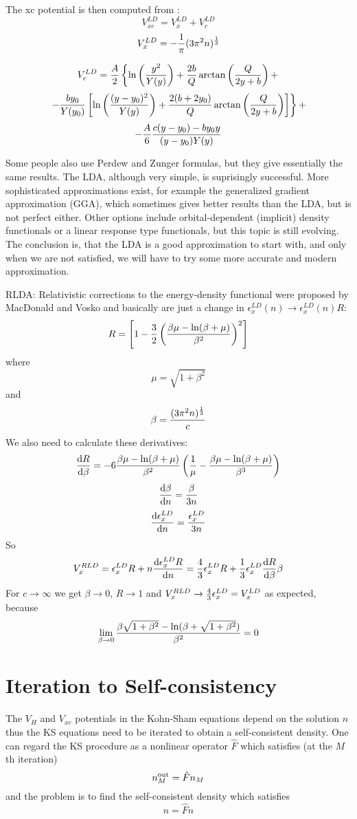 The xc potential is then computed from :
$$V_{xc}^{LD}=V_x^{LD}+V_c^{LD}$$
$$V_x^{LD}=-{1\over\pi}(3\pi^2 n)^{1\over3}$$

$$V_c^{LD}={A\over2}\left\{
\ln\left(y^2\over Y(y)\right)+{2b\over Q}\arctan\left(Q\over 2y+b\right)+
\right.
$$
$$\left.
-{by_0\over Y(y_0)}\left[\ln\left((y-y_0)^2\over Y(y)\right)
+{2(b+2y_0)\over Q}\arctan\left(Q\over 2y+b\right)
\right] \right\}+$$
$$
-{A\over6}{c(y-y_0)-by_0y\over (y-y_0)Y(y)}
$$

Some people also use Perdew and Zunger formulas, but they give essentially the
same results.
The LDA, although very simple, is suprisingly successful. More sophisticated
approximations exist, for example the generalized gradient approximation (GGA),
which sometimes gives better results than the LDA, but is not perfect either.
Other options include orbital-dependent (implicit) density functionals or a
linear response type functionals, but this topic is still evolving. The
conclusion is, that the LDA is a good approximation to start with, and only
when we are not satisfied, we will have to try some more accurate and modern
approximation.

RLDA: Relativistic corrections to the energy-density functional were proposed
by MacDonald and Vosko and basically are just a change in 
$\epsilon_x^{LD}(n)\rightarrow\epsilon_x^{LD}(n)R$:
$$R = 
\left[1-{3\over2}\left(\beta\mu-\ln(\beta+\mu)\over\beta^2\right)^2\right]$$
where
$$\mu=\sqrt{1+\beta^2}$$
and
$$\beta={(3\pi^2n)^{1\over3}\over c}$$
We also need to calculate these derivatives:
$${{\rm d} R\over{\rm d} \beta}=
-6{\beta\mu-\ln(\beta+\mu)\over\beta^2}\left({1\over\mu}-
{\beta\mu-\ln(\beta+\mu)\over\beta^3}\right)
$$
$${{\rm d} \beta\over{\rm d} n}={\beta\over 3n}$$
$${{\rm d} \epsilon_x^{LD}\over{\rm d} n}={\epsilon_x^{LD}\over 3n}$$
So
$$V_x^{RLD}=\epsilon_x^{LD}R+n{{\rm d} \epsilon_x^{LD}R\over{\rm d} n}=
{4\over3}\epsilon_x^{LD}R+{1\over3}\epsilon_x^{LD}{{\rm d} R\over{\rm d}\beta}\beta$$
For $c\to\infty$ we get $\beta\to0$, $R\to1$ and 
$V_x^{RLD}\to {4\over3}\epsilon_x^{LD}=V_x^{LD}$ as expected, because
$$\lim_{\beta\to0}{\beta\sqrt{1+\beta^2}-\ln(\beta+\sqrt{1+\beta^2})\over
\beta^2} = 0$$

\section{Iteration to Self-consistency}

The $V_H$ and $V_{xc}$ potentials in the Kohn-Sham equations  depend
on the solution $n$ thus the KS equations need to be iterated to obtain a 
self-consistent density. One can regard the KS procedure as a nonlinear operator
$\hat F$ which satisfies (at the $M$th iteration)
$$n_M^{\rm out}=\hat F n_M $$
and the problem is to find the self-consistent density which satisfies
$$n=\hat F n $$

